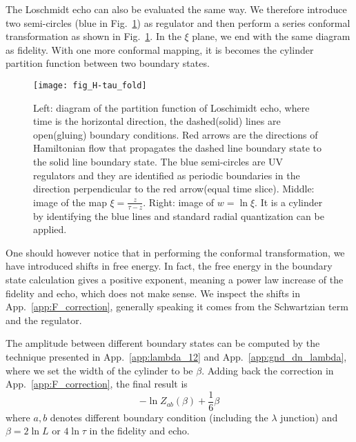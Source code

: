 The Loschmidt echo can also be evaluated the same way. We therefore introduce two semi-circles (blue in Fig.~\ref{fig:H-tau_fold}) as regulator and then perform a series conformal transformation as shown in Fig.~\ref{fig:H-tau_fold}. In the $\xi$ plane, we end with the same diagram as fidelity. With one more conformal mapping, it is becomes the cylinder partition function between two boundary states. 

\begin{figure}[htb]
\centering
\texttt{[image: fig\_H-tau\_fold]}
\caption{Left: diagram of the partition function of Loschimidt echo, where time is the horizontal direction, the dashed(solid) lines are open(gluing) boundary conditions. Red arrows are the directions of Hamiltonian flow that propagates the dashed line boundary state to the solid line boundary state. The blue semi-circles are UV regulators and they are identified as periodic boundaries in the direction perpendicular to the red arrow(equal time slice). Middle: image of the map $\xi = \frac{z}{\tau - z}$. Right: image of $w = \ln \xi$. It is a cylinder by identifying the blue lines and standard radial quantization can be applied. }
\label{fig:H-tau_fold}
\end{figure}

One should however notice that in performing the conformal transformation, we have introduced shifts in free energy. In fact, the free energy in the boundary state calculation gives a positive exponent, meaning a power law increase of the fidelity and echo, which does not make sense. We inspect the shifts in App.~\ref{app:F_correction}, generally speaking it comes from the Schwartzian term and the regulator. 

The amplitude between different boundary states can be computed by the technique presented in App.~\ref{app:lambda_12} and App.~\ref{app:gnd_dn_lambda}, where we set the width of the cylinder to be $\beta$. Adding back the correction in App.~\ref{app:F_correction}, the final result is
\begin{equation}
 - \ln Z_{ab }( \beta ) + \frac{1}{6} \beta 
\end{equation}
where $a,b$ denotes different boundary condition (including the $\lambda$ junction) and $\beta = 2 \ln L$ or  $ 4 \ln \tau$ in the fidelity and echo. 

